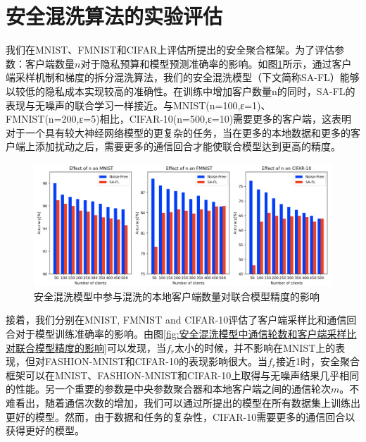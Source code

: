 \section{安全混洗算法的实验评估}
我们在MNIST、FMNIST和CIFAR上评估所提出的安全聚合框架。为了评估参数：客户端数量$n$对于隐私预算和模型预测准确率的影响。如图\ref{fig:安全混洗模型中参与混洗的本地客户端数量对联合模型精度的影响}所示，通过客户端采样机制和梯度的拆分混洗算法，我们的安全混洗模型（下文简称SA-FL）能够以较低的隐私成本实现较高的准确性。在训练中增加客户数量n的同时，SA-FL的表现与无噪声的联合学习一样接近。与MNIST(n=100,ε=1)、FMNIST(n=200,ε=5)相比，CIFAR-10(n=500,ε=10)需要更多的客户端，这表明对于一个具有较大神经网络模型的更复杂的任务，当在更多的本地数据和更多的客户端上添加扰动之后，需要更多的通信回合才能使联合模型达到更高的精度。

\begin{figure}[!hbt]
\centering
  	\includegraphics[scale=0.37]{fig2/C5/SA-FL}%
	\caption{安全混洗模型中参与混洗的本地客户端数量对联合模型精度的影响}
  	\label{fig:安全混洗模型中参与混洗的本地客户端数量对联合模型精度的影响} 
\end{figure}

接着，我们分别在MNIST, FMNIST and CIFAR-10评估了客户端采样比和通信回合对于模型训练准确率的影响。由图\ref{fig:安全混洗模型中通信轮数和客户端采样比对联合模型精度的影响}可以发现，当$f_{r}$太小的时候，并不影响在MNIST上的表现，但对FASHION-MNIST和CIFAR-10的表现影响很大。当$f_{r}$接近1时，安全聚合框架可以在MNIST、FASHION-MNIST和CIFAR-10上取得与无噪声结果几乎相同的性能。另一个重要的参数是中央参数聚合器和本地客户端之间的通信轮次$m$。不难看出，随着通信次数的增加，我们可以通过所提出的模型在所有数据集上训练出更好的模型。然而，由于数据和任务的复杂性，CIFAR-10需要更多的通信回合以获得更好的模型。

